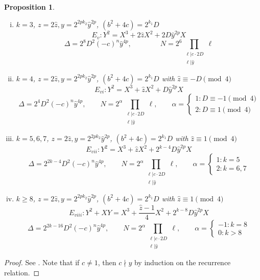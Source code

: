 \documentclass[12pt]{amsart}
\newtheorem{prop}[thm]{Proposition}
\theoremstyle{definition}
\newcommand{\notdiv}{\nmid}
\begin{document}
\begin{prop}
\begin{enumerate}[1.]
\begin{enumerate}[(i)]
\item $k = 3$, $z = 2 \hat{z}, y = 2^{2pk_2}\hat{y}^{2p}$, $(b^2+4c) = 2^{k_1}D$
\[ E_{v} : Y^2 = X^3 + 2\hat{z}X^2 + 2D\hat{y}^{2p}X \]
\[ \Delta = 2^8D^2(-c)^n\hat{y}^{4p} , \qquad \qquad N = 2^6 \prod_{\substack{ \ell | c \cdot 2D \\ \ell | \hat{y}}} \ell  \]

\item $k=4$, $z = 2 \hat{z}, y = 2^{2pk_2}\hat{y}^{2p}$, $(b^2+4c) = 2^{k_1}D$ with $\hat{z} \equiv -D \pmod{4}$
\[ E_{vi} : Y^2 = X^3 +\hat{z}X^2 + D \hat{y}^{2p} X \]
\[ \Delta = 2^4D^2(-c)^n\hat{y}^{4p}, \qquad N = 2^\alpha \prod_{\substack{ \ell | c \cdot 2D \\ \ell | \hat{y}}} \ell ,  \qquad \alpha =  \begin{cases} 1: D \equiv -1 \pmod{4}\\ 2 : D \equiv 1 \pmod{4} \end{cases} \]


\item $k = 5,6,7$, $z = 2 \hat{z}, y = 2^{2pk_2}\hat{y}^{2p}$, $(b^2+4c) = 2^{k_1}D$ with $\hat{z} \equiv 1 \pmod{4}$
\[ E_{vii} : Y^2 = X^3 + \hat{z}X^2 + 2^{k-4}D \hat{y}^{2p} X \]
\[ \Delta = 2^{2k-4}D^2(-c)^n\hat{y}^{4p}, \qquad N = 2^\alpha \prod_{\substack{ \ell | c \cdot 2D \\ \ell | \hat{y}}} \ell ,  \qquad \alpha =  \begin{cases} 1: k = 5 \\ 2 : k = 6,7 \end{cases} \]

\item $k\geq 8$, $z = 2 \hat{z}, y = 2^{2pk_2}\hat{y}^{2p}$, $(b^2+4c) = 2^{k_1}D$ with $\hat{z} \equiv 1 \pmod{4}$
\[ E_{viii} : Y^2 + XY = X^3 + \frac{\hat{z}-1}{4} X^2 + 2^{k-8}D \hat{y}^{2p} X \]
\[ \Delta = 2^{2k-16}D^2(-c)^n\hat{y}^{4p}, \qquad N = 2^\alpha \prod_{\substack{ \ell | c \cdot 2D \\ \ell | \hat{y}}} \ell ,  \qquad \alpha =  \begin{cases} -1: k = 8 \\ 0 : k > 8 \end{cases} \]


\end{enumerate}

\end{enumerate}
\end{prop}
\begin{proof}
See \cite{bennett04}.  Note that if $c \neq 1$, then $c \notdiv y$ by induction on the recurrence relation.
\end{proof}
\end{document}
